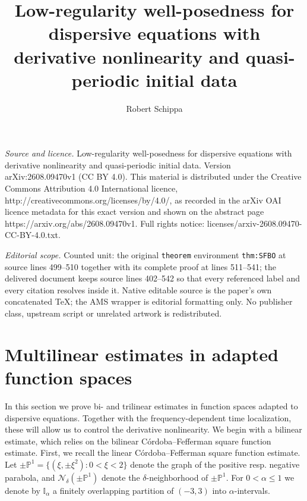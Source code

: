 \documentclass[10pt,a4paper]{amsart}
\begin{document}
\title[Low-regularity well-posedness for dispersive equations with ]{Low-regularity well-posedness for dispersive equations with derivative nonlinearity and quasi-periodic initial data}
\author{Robert Schippa}
\date{}
\maketitle
\noindent\emph{Source and licence.} Low-regularity well-posedness for dispersive equations with derivative nonlinearity and quasi-periodic initial data. Version arXiv:2608.09470v1 (CC BY 4.0). This material is distributed under the Creative Commons Attribution 4.0 International licence, http://creativecommons.org/licenses/by/4.0/, as recorded in the arXiv OAI licence metadata for this exact version and shown on the abstract page https://arxiv.org/abs/2608.09470v1. Full rights notice: licenses/arxiv-2608.09470-CC-BY-4.0.txt.\par\smallskip
\noindent\textit{Editorial scope.} Counted unit: the original \texttt{theorem} environment \texttt{thm:SFBO} at source lines 499--510 together with its complete proof at lines 511--541; the delivered document keeps source lines 402--542 so that every referenced label and every citation resolves inside it. Native editable source is the paper's own concatenated TeX; the AMS wrapper is editorial formatting only. No publisher class, upstream script or unrelated artwork is redistributed.
\section{Multilinear estimates in adapted function spaces}
\label{section:Trilinear}
In this section we prove bi- and trilinear estimates in function spaces adapted to dispersive equations. Together with the frequency-dependent time localization, these will allow us to control the derivative nonlinearity.
We begin with a bilinear estimate, which relies on the bilinear C\'ordoba--Fefferman square function estimate. First, we recall the linear C\'ordoba--Fefferman square function estimate. Let $\pm \mathbb{P}^1 = \{ (\xi,\pm \xi^2) : 0 < \xi < 2 \}$ denote the graph of the positive resp. negative parabola, and $\mathcal{N}_{\delta}(\pm \mathbb{P}^1)$ denote the $\delta$-neighborhood of $\pm \mathbb{P}^1$. For $0< \alpha \leq 1$ we denote by $\mathbb{I}_{\alpha}$ a finitely overlapping partition of $(-3,3)$ into $\alpha$-intervals.
\end{document}

